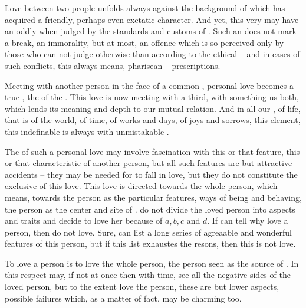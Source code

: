 \subpa 
Love between two people
unfolds always against the background of  which has
acquired a friendly, perhaps even exctatic character.  And yet, this
very  may have an oddly  
when judged by the standards and customs of .  
Such an 
does not mark a break, an immorality, but at most, an offence which is
so perceived only by those who can not judge otherwise than
according to the ethical -- and in cases of such conflicts, this always 
means, pharisean -- prescriptions.


\subpa  
Meeting with another person in the face of a common , 
personal love becomes a true , the  of 
 the . 
This love is now meeting 
with a third, with something  us both, which lends its 
meaning and depth to our mutual relation. And in all our 
, of life, that is of the world, of time, of works and 
days, of joys and sorrows, this  element, this 
indefinable  is always  with unmistakable 
.

\subpa
The  of such a personal love may 
 involve fascination with this or that feature, this or that 
 characteristic of another 
person, but all such features are but attractive accidents -- they 
may be needed for  to fall in love, but they do not constitute 
the exclusive   of this love. This love is directed 
towards the whole person, which means, towards the person as 
 the particular features, ways of being and 
behaving, the person as the center and site of .  do not divide the loved person into aspects and 
traits and decide to love her because of $a,b,c$ and $d$. If  can 
tell why  love a person, then  do not love. Sure,  
can list a long series of agreaable and wonderful features of this 
person, but if this list exhaustes the resons, then this is not love. 

To love a person is to love the whole person, the 
person seen as the source of . In this respect 
 may, if not at once then with time, see all the negative sides 
of the loved person, but to the extent  love the person, these 
are but lower aspects, possible failures which, as a matter of fact, 
may be charming too. 

